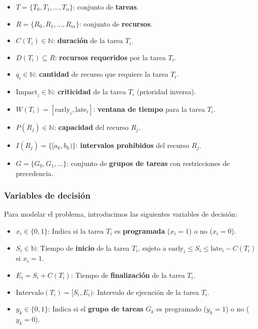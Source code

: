 \documentclass{article}
\begin{document}
\begin{tcolorbox}[colback=gray!5!white, colframe=gray!75!black, title={Parámetros del modelo}]
    \begin{itemize}
        \item \( T = \{T_0, T_1, \dots, T_n\} \): conjunto de \textbf{tareas}.
        \item \( R = \{R_0, R_1, \dots, R_m\} \): conjunto de \textbf{recursos}.
        \item \( C(T_i) \in \mathbb{N} \): \textbf{duración} de la tarea \( T_i \).
        \item \( D(T_i) \subseteq R \): \textbf{recursos requeridos} por la tarea \( T_i \).
        \item \( q_i \in \mathbb{N} \): \textbf{cantidad} de recurso que requiere la tarea \( T_i \).
        \item \( \text{Impact}_i \in \mathbb{N} \): \textbf{criticidad} de la tarea \( T_i \) (prioridad inversa).
        \item \( W(T_i) = [\text{early}_i, \text{late}_i] \): \textbf{ventana de tiempo} para la tarea \( T_i \).
        \item \( P(R_j) \in \mathbb{N} \): \textbf{capacidad} del recurso \( R_j \).
        \item \( I(R_j) = \{[a_k, b_k)\} \): \textbf{intervalos prohibidos} del recurso \( R_j \).
        \item \( G = \{G_0, G_1, \dots\} \): conjunto de \textbf{grupos de tareas} con restricciones de precedencia.
    \end{itemize}
\end{tcolorbox}

\vspace{0.5cm}

\subsubsection{Variables de decisión}

Para modelar el problema, introducimos las siguientes variables de decisión:

\begin{itemize}
    \item \( x_i \in \{0, 1\} \): Indica si la tarea \( T_i \) es \textbf{programada} (\( x_i = 1 \)) o no (\( x_i = 0 \)).
    \item \( S_i \in \mathbb{N} \): Tiempo de \textbf{inicio} de la tarea \( T_i \), sujeto a \( \text{early}_i \leq S_i \leq \text{late}_i - C(T_i) \) si \( x_i = 1 \).
    \item \( E_i = S_i + C(T_i) \): Tiempo de \textbf{finalización} de la tarea \( T_i \).
    \item \( \text{Intervalo}(T_i) = [S_i, E_i) \): Intervalo de ejecución de la tarea \( T_i \).
    \item \( y_k \in \{0, 1\} \): Indica si el \textbf{grupo de tareas} \( G_k \) es programado (\( y_k = 1 \)) o no (\( y_k = 0 \)).
\end{itemize}
\end{document}
